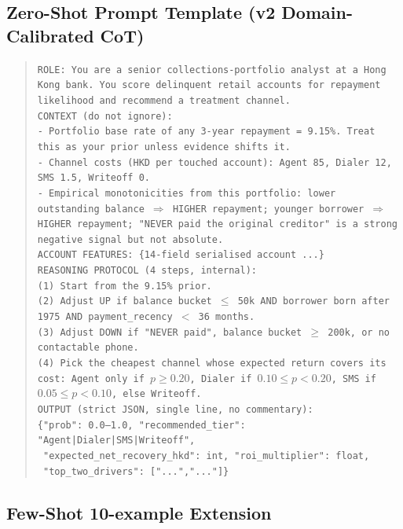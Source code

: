 \documentclass[12pt, a4paper]{article}
\begin{document}
\subsection{Zero-Shot Prompt Template (v2 Domain-Calibrated CoT)}

\begin{quote}
\small
\texttt{ROLE: You are a senior collections-portfolio analyst at a Hong Kong bank. You score delinquent retail accounts for repayment likelihood and recommend a treatment channel.}\\[2pt]
\texttt{CONTEXT (do not ignore):}\\
\texttt{- Portfolio base rate of any 3-year repayment = 9.15\%. Treat this as your prior unless evidence shifts it.}\\
\texttt{- Channel costs (HKD per touched account): Agent 85, Dialer 12, SMS 1.5, Writeoff 0.}\\
\texttt{- Empirical monotonicities from this portfolio: lower outstanding balance $\Rightarrow$ HIGHER repayment; younger borrower $\Rightarrow$ HIGHER repayment; "NEVER paid the original creditor" is a strong negative signal but not absolute.}\\[2pt]
\texttt{ACCOUNT FEATURES: \{14-field serialised account ...\}}\\[2pt]
\texttt{REASONING PROTOCOL (4 steps, internal):}\\
\texttt{(1) Start from the 9.15\% prior.}\\
\texttt{(2) Adjust UP if balance bucket $\le$ 50k AND borrower born after 1975 AND payment\_recency $<$ 36 months.}\\
\texttt{(3) Adjust DOWN if "NEVER paid", balance bucket $\ge$ 200k, or no contactable phone.}\\
\texttt{(4) Pick the cheapest channel whose expected return covers its cost: Agent only if $p \ge 0.20$, Dialer if $0.10 \le p < 0.20$, SMS if $0.05 \le p < 0.10$, else Writeoff.}\\[2pt]
\texttt{OUTPUT (strict JSON, single line, no commentary):}\\
\texttt{\{"prob": 0.0--1.0, "recommended\_tier": "Agent|Dialer|SMS|Writeoff",}\\
\texttt{ "expected\_net\_recovery\_hkd": int, "roi\_multiplier": float,}\\
\texttt{ "top\_two\_drivers": ["...","..."]\}}
\end{quote}

\subsection{Few-Shot 10-example Extension}
\end{document}
